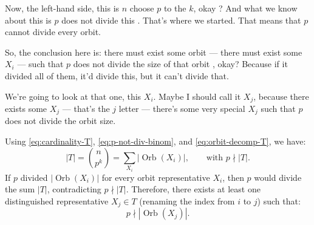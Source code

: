 \begin{proofWrapper}
\begin{content}
\begin{center}
\end{center}
\end{content}

\begin{speech}[00:12:49 - 00:14:00]
Now, the left-hand side, this is $n$ choose $p$ to the $k$, okay ? And what we know about this is $p$ does not divide this . That's where we started. That means that $p$ cannot divide every orbit.

So, the conclusion here is: there must exist some orbit --- there must exist some $X_i$ --- such that $p$ does not divide the size of that orbit , okay? Because if it divided all of them, it'd divide this, but it can't divide that.

We're going to look at that one, this $X_i$. Maybe I should call it $X_j$, because there exists some $X_j$  --- that's the $j$ letter --- there's some very special $X_j$ such that $p$ does not divide the orbit size.
\end{speech}

\begin{content}
Using \eqref{eq:cardinality-T}, \eqref{eq:p-not-div-binom}, and \eqref{eq:orbit-decomp-T}, we have:
\[
|T| = \binom{n}{p^k} = \sum_{X_i} |\operatorname{Orb}(X_i)|, \qquad \text{with } p \nmid |T|.
\]
If $p$ divided $|\operatorname{Orb}(X_i)|$ for every orbit representative $X_i$, then $p$ would divide the sum $|T|$, contradicting $p \nmid |T|$. Therefore, there exists at least one distinguished representative $X_j \in T$ (renaming the index from $i$ to $j$) such that:
\begin{equation}\label{eq:orbit-xj-coprime}
p \nmid |\operatorname{Orb}(X_j)|.
\end{equation}
\end{content}


\end{proofWrapper}
